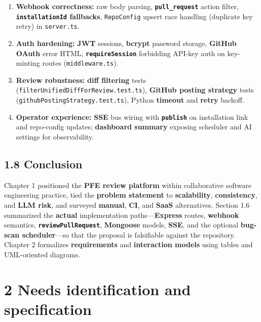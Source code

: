 \documentclass[11pt,a4paper]{report}
\begin{document}
\begin{enumerate}
\item \textbf{Webhook correctness:} raw body parsing, \textbf{\texttt{pull\_request}} action filter, \textbf{\texttt{installationId} fallbacks}, \texttt{RepoConfig} upsert race handling (duplicate key retry) in \texttt{server.ts}.
\item \textbf{Auth hardening:} \textbf{JWT} sessions, \textbf{bcrypt} password storage, \textbf{GitHub OAuth} error HTML, \textbf{\texttt{requireSession}} forbidding API-key auth on key-minting routes (\texttt{middleware.ts}).
\item \textbf{Review robustness:} \textbf{diff filtering} tests (\texttt{filterUnifiedDiffForReview.test.ts}), \textbf{GitHub posting strategy} tests (\texttt{githubPostingStrategy.test.ts}), Python \textbf{timeout} and \textbf{retry} backoff.
\item \textbf{Operator experience:} \textbf{SSE} bus wiring with \textbf{\texttt{publish}} on installation link and repo-config updates; \textbf{dashboard summary} exposing scheduler and AI settings for observability.
\end{enumerate}


\section{1.8 Conclusion}


Chapter 1 positioned the \textbf{PFE review platform} within collaborative software engineering practice, tied the \textbf{problem statement} to \textbf{scalability}, \textbf{consistency}, and \textbf{LLM risk}, and surveyed \textbf{manual}, \textbf{CI}, and \textbf{SaaS} alternatives. Section 1.6 summarized the \textbf{actual} implementation paths—\textbf{Express} routes, \textbf{webhook} semantics, \textbf{\texttt{reviewPullRequest}}, \textbf{Mongoose} models, \textbf{SSE}, and the optional \textbf{bug-scan scheduler}—so that the proposal is falsifiable against the repository. Chapter 2 formalizes \textbf{requirements} and \textbf{interaction models} using tables and UML-oriented diagrams.




\chapter{2 Needs identification and specification}
\end{document}
